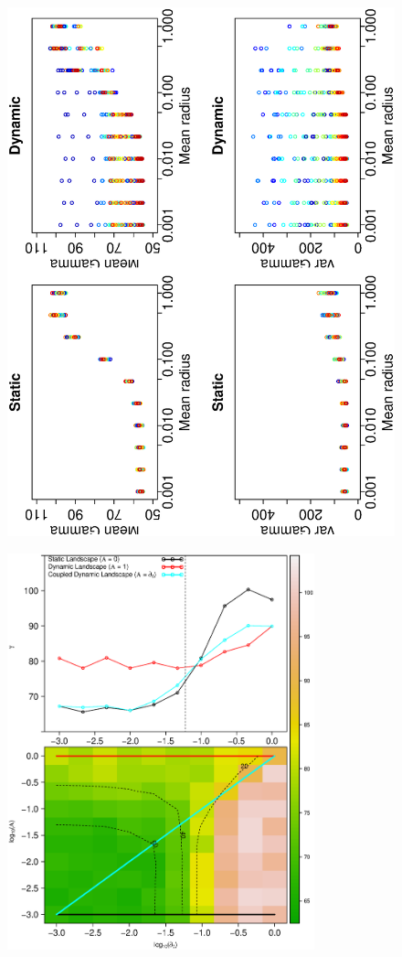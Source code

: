 \documentclass[12pt]{article}
\begin{document}
\begin{figure}[hb!]
\hspace{-0.5 in}\includegraphics[width=5in,angle=-90]{./figures/mean_variance_radius_gamma.eps}
\caption{}
\label{fig:Figure6}
\end{figure}

\begin{figure}[hb!]
\begin{center}
\hspace{-0.5 in}\includegraphics[width=3.5in]{./figures/Figure5.eps}
\end{center}
\caption{}
\label{fig:Figure7}
\end{figure}
\end{document}
